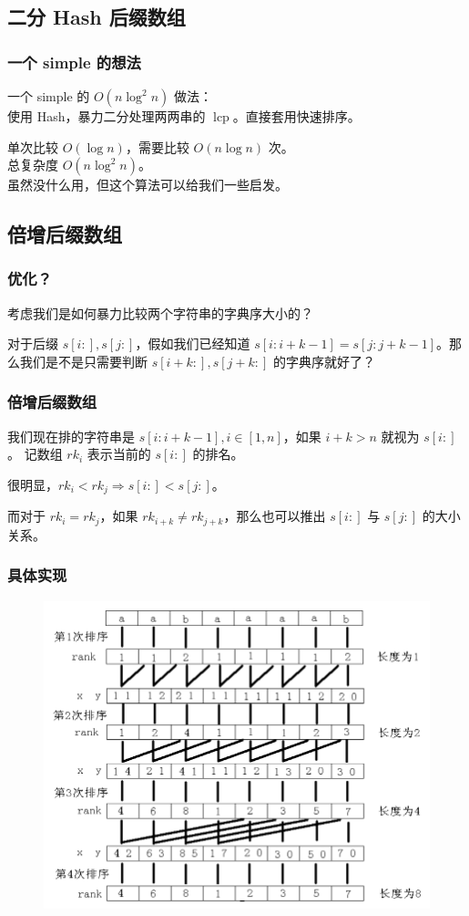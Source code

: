 \documentclass[UTF8]{beamer}
\newcommand{\lcp}{\operatorname{lcp}}
\begin{document}
\begin{CJK}{UTF8}{song}
\subsection{二分 Hash 后缀数组}
\begin{frame}
	\frametitle{一个 simple 的想法}
	\pause
	\par
	一个 simple 的 $O(n\log^2 n)$ 做法：\\
	使用 Hash，暴力二分处理两两串的 ${\lcp}$。直接套用快速排序。
	\pause
	\par
	单次比较 $O(\log n)$，需要比较 $O(n\log n)$ 次。\\
	总复杂度 $O(n\log^2 n)$。\\
	虽然没什么用，但这个算法可以给我们一些启发。
\end{frame}
\subsection{倍增后缀数组}
\begin{frame}
	\frametitle{优化？}
	考虑我们是如何暴力比较两个字符串的字典序大小的？
	\pause
	\par
	对于后缀 $s[i:],s[j:]$，假如我们已经知道 $s[i:i+k-1]=s[j:j+k-1]$。那么我们是不是只需要判断 $s[i+k:],s[j+k:]$ 的字典序就好了？
\end{frame}
\begin{frame}
	\frametitle{倍增后缀数组}
	我们现在排的字符串是 $s[i:i+k-1],i\in[1,n]$，如果 $i+k>n$ 就视为 $s[i:]$。
	记数组 $rk_i$ 表示当前的 $s[i:]$ 的排名。
	\pause
	\par
	很明显，$rk_i<rk_j\Rightarrow s[i:]<s[j:]$。\\
	\pause
	\par
	而对于 $rk_i=rk_j$，如果 $rk_{i+k}\neq rk_{j+k}$，那么也可以推出 $s[i:]$ 与 $s[j:]$ 的大小关系。
\end{frame}
\begin{frame}
	\frametitle{具体实现}
	\pause
	\par
	\begin{figure}[h]
		\centering
		\includegraphics[width=0.7\linewidth]{figures/sa.png}

\end{figure}
\end{frame}
\end{CJK}
\end{document}
